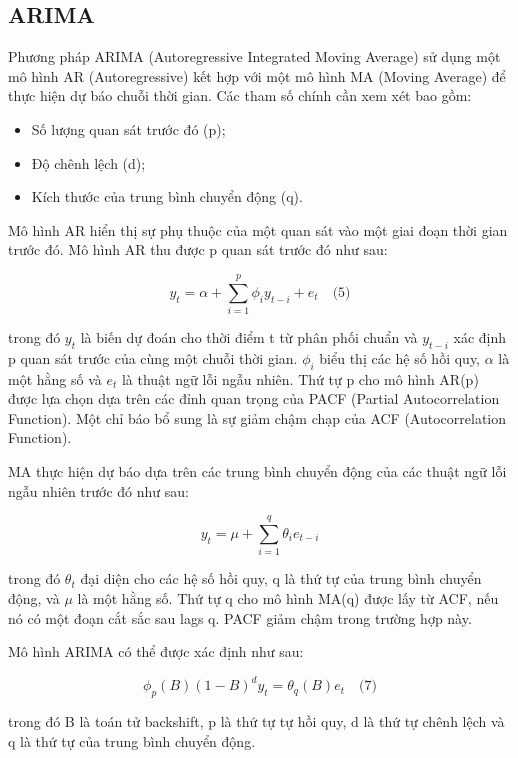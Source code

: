 \subsection{ARIMA}

Phương pháp ARIMA (Autoregressive Integrated Moving Average) sử dụng một mô hình AR (Autoregressive) kết hợp với một mô hình MA (Moving Average) để thực hiện dự báo chuỗi thời gian. Các tham số chính cần xem xét bao gồm:

\begin{itemize}
  \item Số lượng quan sát trước đó (p);
  \item Độ chênh lệch (d);
  \item Kích thước của trung bình chuyển động (q).
\end{itemize}

Mô hình AR hiển thị sự phụ thuộc của một quan sát vào một giai đoạn thời gian trước đó. Mô hình AR thu được p quan sát trước đó như sau:

\[
y_t = \alpha + \sum_{i=1}^{p} \phi_i y_{t-i} + e_t \quad \text{(5)}
\]

trong đó \(y_t\) là biến dự đoán cho thời điểm t từ phân phối chuẩn và \(y_{t-i}\) xác định p quan sát trước của cùng một chuỗi thời gian. \(\phi_i\) biểu thị các hệ số hồi quy, \(\alpha\) là một hằng số và \(e_t\) là thuật ngữ lỗi ngẫu nhiên. Thứ tự p cho mô hình AR(p) được lựa chọn dựa trên các đỉnh quan trọng của PACF (Partial Autocorrelation Function). Một chỉ báo bổ sung là sự giảm chậm chạp của ACF (Autocorrelation Function).

MA thực hiện dự báo dựa trên các trung bình chuyển động của các thuật ngữ lỗi ngẫu nhiên trước đó như sau:

\[
y_t = \mu + \sum_{i=1}^{q} \theta_i e_{t-i}
\]

trong đó \(\theta_t\) đại diện cho các hệ số hồi quy, q là thứ tự của trung bình chuyển động, và \(\mu\) là một hằng số. Thứ tự q cho mô hình MA(q) được lấy từ ACF, nếu nó có một đoạn cắt sắc sau lags q. PACF giảm chậm trong trường hợp này.

Mô hình ARIMA có thể được xác định như sau:

\[
\phi_p(B)(1 - B)^d y_t = \theta_q(B) e_t \quad \text{(7)}
\]

trong đó B là toán tử backshift, p là thứ tự tự hồi quy, d là thứ tự chênh lệch và q là thứ tự của trung bình chuyển động.